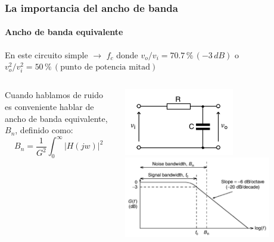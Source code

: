 \documentclass{beamer}
\begin{document}
\begin{frame}
\frametitle{La importancia del ancho de banda}
\framesubtitle{Ancho de banda equivalente}
En este circuito simple $\rightarrow$ $f_c$ donde
$v_o/v_i = 70.7\,\%\,(-3\,dB)$ o $v_o^2/v_i^2 = 50\,\%\,(\text{punto de potencia
mitad})$

\begin{columns}
\begin{column}{0.5\textwidth}
Cuando hablamos de ruido es conveniente hablar de ancho de banda equivalente,
$B_n$, definido como:
$$B_n = \frac{1}{G^2}\int_{0}^{\infty}{|H(jw)|^2}$$

\end{column}
\begin{column}{0.5\textwidth}
\begin{center}
\includegraphics[width=0.6\textwidth]{d1/filtro_pasa_bajas_ruido} \\
\includegraphics[width=0.8\textwidth]{d1/bw_ruido}
\end{center}
\end{column}
\end{columns}
\end{frame} 
\end{document}
